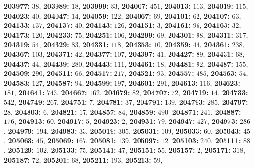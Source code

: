 \textsf{\bfseries 203977:} $38$, \textsf{\bfseries 203989:} $18$, \textsf{\bfseries 203999:} $83$, \textsf{\bfseries 204007:} $451$, \textsf{\bfseries 204013:} $113$, \textsf{\bfseries 204019:} $115$, \textsf{\bfseries 204023:} $40$, \textsf{\bfseries 204047:} $14$, \textsf{\bfseries 204059:} $122$, \textsf{\bfseries 204067:} $69$, \textsf{\bfseries 204101:} $62$, \textsf{\bfseries 204107:} $63$, \textsf{\bfseries 204133:} $137$, \textsf{\bfseries 204137:} $40$, \textsf{\bfseries 204143:} $126$, \textsf{\bfseries 204151:} $3$, \textsf{\bfseries 204161:} $96$, \textsf{\bfseries 204163:} $32$, \textsf{\bfseries 204173:} $120$, \textsf{\bfseries 204233:} $75$, \textsf{\bfseries 204251:} $106$, \textsf{\bfseries 204299:} $69$, \textsf{\bfseries 204301:} $98$, \textsf{\bfseries 204311:} $317$, \textsf{\bfseries 204319:} $54$, \textsf{\bfseries 204329:} $83$, \textsf{\bfseries 204331:} $118$, \textsf{\bfseries 204353:} $10$, \textsf{\bfseries 204359:} $44$, \textsf{\bfseries 204361:} $238$, \textsf{\bfseries 204367:} $103$, \textsf{\bfseries 204371:} $42$, \textsf{\bfseries 204377:} $107$, \textsf{\bfseries 204397:} $41$, \textsf{\bfseries 204427:} $89$, \textsf{\bfseries 204431:} $68$, \textsf{\bfseries 204437:} $44$, \textsf{\bfseries 204439:} $280$, \textsf{\bfseries 204443:} $111$, \textsf{\bfseries 204461:} $18$, \textsf{\bfseries 204481:} $92$, \textsf{\bfseries 204487:} $155$, \textsf{\bfseries 204509:} $290$, \textsf{\bfseries 204511:} $66$, \textsf{\bfseries 204517:} $217$, \textsf{\bfseries 204521:} $93$, \textsf{\bfseries 204557:} $485$, \textsf{\bfseries 204563:} $54$, \textsf{\bfseries 204583:} $127$, \textsf{\bfseries 204587:} $94$, \textsf{\bfseries 204599:} $197$, \textsf{\bfseries 204601:} $291$, \textsf{\bfseries 204613:} $116$, \textsf{\bfseries 204623:} $181$, \textsf{\bfseries 204641:} $743$, \textsf{\bfseries 204667:} $162$, \textsf{\bfseries 204679:} $82$, \textsf{\bfseries 204707:} $72$, \textsf{\bfseries 204719:} $14$, \textsf{\bfseries 204733:} $542$, \textsf{\bfseries 204749:} $267$, \textsf{\bfseries 204751:} $7$, \textsf{\bfseries 204781:} $37$, \textsf{\bfseries 204791:} $139$, \textsf{\bfseries 204793:} $285$, \textsf{\bfseries 204797:} $28$, \textsf{\bfseries 204803:} $6$, \textsf{\bfseries 204821:} $17$, \textsf{\bfseries 204857:} $84$, \textsf{\bfseries 204859:} $490$, \textsf{\bfseries 204871:} $241$, \textsf{\bfseries 204887:} $176$, \textsf{\bfseries 204913:} $60$, \textsf{\bfseries 204917:} $5$, \textsf{\bfseries 204923:} $2$, \textsf{\bfseries 204931:} $79$, \textsf{\bfseries 204947:} $427$, \textsf{\bfseries 204973:} $286$, \textsf{\bfseries 204979:} $194$, \textsf{\bfseries 204983:} $33$, \textsf{\bfseries 205019:} $305$, \textsf{\bfseries 205031:} $109$, \textsf{\bfseries 205033:} $60$, \textsf{\bfseries 205043:} $45$, \textsf{\bfseries 205063:} $45$, \textsf{\bfseries 205069:} $167$, \textsf{\bfseries 205081:} $139$, \textsf{\bfseries 205097:} $12$, \textsf{\bfseries 205103:} $240$, \textsf{\bfseries 205111:} $88$, \textsf{\bfseries 205129:} $102$, \textsf{\bfseries 205133:} $75$, \textsf{\bfseries 205141:} $47$, \textsf{\bfseries 205151:} $55$, \textsf{\bfseries 205157:} $2$, \textsf{\bfseries 205171:} $318$, \textsf{\bfseries 205187:} $72$, \textsf{\bfseries 205201:} $68$, \textsf{\bfseries 205211:} $193$, \textsf{\bfseries 205213:} $59$, 
